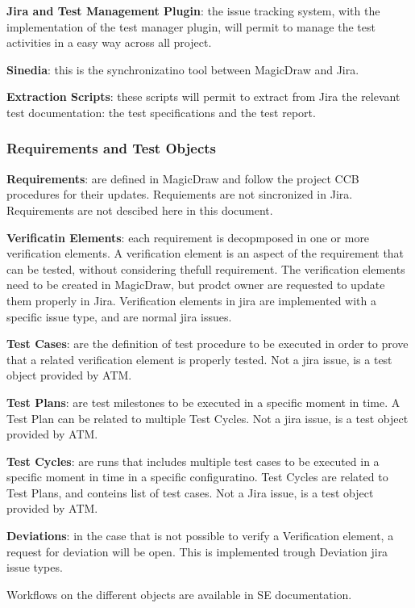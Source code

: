 {\bf Jira and Test Management Plugin}: the issue tracking system, with the implementation of the test manager plugin, will permit to manage the test activities in a easy way across all project.

{\bf Sinedia}: this is the synchronizatino tool between MagicDraw and Jira.

{\bf Extraction Scripts}: these scripts will permit to extract from Jira the relevant test documentation: the test specifications and the test report.


\subsubsection{Requirements and Test Objects}

{\bf Requirements}: are defined in MagicDraw and follow the project CCB procedures for their updates. Requiements are not sincronized in Jira.
Requirements are not descibed here in this document.

{\bf Verificatin Elements}: each requirement is decopmposed in one or more verification elements. A verification element is an aspect of the requirement that can be tested, without considering thefull requirement. The verification elements need to be created in MagicDraw, but prodct owner are requested to update them properly in Jira. Verification elements in jira are implemented with a specific issue type, and are normal jira issues.

{\bf Test Cases}: are the definition of test procedure to be executed in order to prove that a related verification element is properly tested. Not a jira issue, is a test object provided by ATM.

{\bf Test Plans}: are test milestones to be executed in a specific moment in time. A Test Plan can be related to multiple Test Cycles. Not a jira issue, is a test object provided by ATM.

{\bf Test Cycles}: are runs that includes multiple test cases to be executed in a specific moment in time in a specific configuratino. Test Cycles are related to Test Plans, and conteins list of test cases. Not a Jira issue, is a test object provided by ATM.

{\bf Deviations}: in the case that is not possible to verify a Verification element, a request for deviation will be open. This is implemented trough Deviation jira issue types.


Workflows on the different objects are available in SE documentation.


